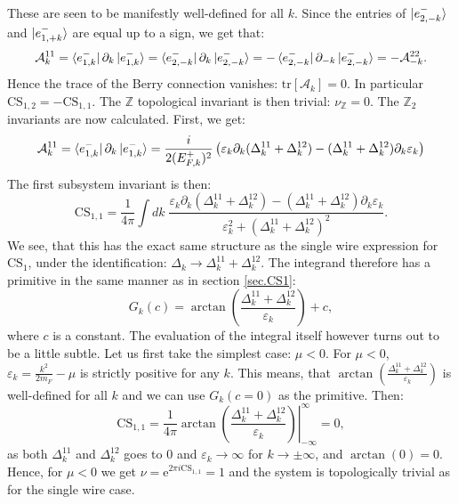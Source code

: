 These are seen to be manifestly well-defined for all $k$. Since the entries of $\ket{e^{-}_{2,-k}}$ and $\ket{e^{-}_{1,+k}}$ are equal up to a sign, we get that:
\begin{equation}
\mathcal{A}^{11}_k = \bra{e^{-}_{1,k}}\partial_k\ket{e^{-}_{1,k}} = \bra{e^{-}_{2,-k}}\partial_k\ket{e^{-}_{2,-k}} = - \bra{e^{-}_{2,-k}}\partial_{-k}\ket{e^{-}_{2,-k}} = -\mathcal{A}^{22}_{-k}. \nonumber
\end{equation}
Hence the trace of the Berry connection vanishes: $\text{tr}[\mathcal{A}_k] = 0$. In particular $\text{CS}_{1,2} = - \text{CS}_{1,1}$. The $\mathbb{Z}$ topological invariant is then trivial: $\nu_{\mathbb{Z}} = 0$. The $\mathbb{Z}_2$ invariants are now calculated. First, we get:
\begin{equation}
\mathcal{A}^{11}_k = \bra{e^{-}_{1,k}}\partial_k\ket{e^{-}_{1,k}} = \frac{i}{2(E^{+}_{F,k})^2}\left(\varepsilon_k\partial_k(\Delta^{11}_k + \Delta^{12}_k) - (\Delta^{11}_k + \Delta^{12}_k)\partial_k \varepsilon_k\right) \nonumber
\end{equation}
The first subsystem invariant is then:
\begin{equation}
\text{CS}_{1,1} = \frac{1}{4\pi}\int dk \; \frac{\varepsilon_k\partial_k(\Delta^{11}_k + \Delta^{12}_k) - (\Delta^{11}_k + \Delta^{12}_k)\partial_k \varepsilon_k}{\varepsilon_k^2 + (\Delta^{11}_k + \Delta^{12}_k)^2}.
\label{eq.CS11integralform}
\end{equation}
We see, that this has the exact same structure as the single wire expression for $\text{CS}_{1}$, under the identification: $\Delta_k \to \Delta^{11}_k + \Delta^{12}_k$. The integrand therefore has a primitive in the same manner as in section \ref{sec.CS1}:
\begin{equation}
G_k(c) = \arctan\left(\frac{\Delta^{11}_k + \Delta^{12}_k }{\varepsilon_k}\right) + c, \nonumber
\end{equation}
where $c$ is a constant. The evaluation of the integral itself however turns out to be a little subtle. Let us first take the simplest case: $\mu < 0$. For $\mu < 0$, $\varepsilon_k = \frac{k^2}{2m_F} - \mu$ is strictly positive for any $k$. This means, that $\arctan\left(\frac{\Delta^{11}_k + \Delta^{12}_k }{\varepsilon_k}\right)$ is well-defined for all $k$ and we can use $G_k(c = 0)$ as the primitive. Then:
\begin{equation}
\text{CS}_{1,1} = \frac{1}{4\pi}\left.\arctan\left(\frac{\Delta^{11}_k + \Delta^{12}_k }{\varepsilon_k}\right)\right|^{\infty}_{-\infty} = 0, \nonumber
\end{equation}
as both $\Delta^{11}_k$ and $\Delta^{12}_k$ goes to $0$ and $\varepsilon_k \to \infty$ for $k\to \pm \infty$, and $\arctan(0) = 0$. Hence, for $\mu < 0$ we get $\nu = \text{e}^{2\pi i\text{CS}_{1,1}} = 1$ and the system is topologically trivial as for the single wire case. 

